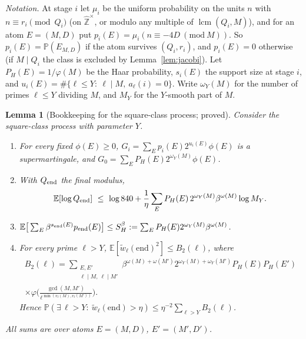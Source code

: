 \documentclass[11pt,reqno]{amsart}
\newtheorem{lemma}[theorem]{Lemma}
\theoremstyle{definition}
\newcommand{\lcm}{\operatorname{lcm}}
\newcommand{\E}{\mathbb E}
\newcommand{\PP}{\mathbb P}
\begin{document}
\emph{Notation.}  At stage $i$ let $\mu_i$ be the uniform probability on the
units $n$ with $n\equiv r_i\pmod{Q_i}$ (on $\hat{\mathbb Z}^\times$, or modulo
any multiple of $\lcm(Q_i,M)$), and for an atom $E=(M,D)$ put
$p_i(E)=\mu_i(n\equiv-4D\ (\mathrm{mod}\ M))$.  So $p_i(E)=\PP(E_{M,D})$ if the
atom survives $(Q_i,r_i)$, and $p_i(E)=0$ otherwise (if $M\mid Q_i$ the class
is excluded by Lemma~\ref{lem:jacobi}).  Let $P_H(E)=1/\varphi(M)$ be the Haar
probability, $s_i(E)$ the support size at stage $i$, and
$u_i(E)=\#\{\ell\le Y:\ \ell\mid M,\ a_\ell(i)=0\}$.  Write $\omega_Y(M)$ for the
number of primes $\ell\le Y$ dividing $M$, and $M_Y$ for the $Y$-smooth part of
$M$.

\begin{lemma}[Bookkeeping for the square-class process; proved]\label{lem:book}
Consider the square-class process with parameter $Y$.
\begin{enumerate}
\item[(a)] For every fixed $\phi(E)\ge0$, $G_i=\sum_Ep_i(E)2^{u_i(E)}\phi(E)$ is
a supermartingale, and $G_0=\sum_EP_H(E)2^{\omega_Y(M)}\phi(E)$.
\item[(b)] With $Q_{\rm end}$ the final modulus,
\[
 \E[\log Q_{\rm end}]\ \le\ \log840+\frac1\eta\sum_EP_H(E)\,2^{\omega_Y(M)}\beta^{\omega(M)}\log M_Y .
\]
\item[(c)] $\E\big[\sum_E\beta^{s_{\rm end}(E)}p_{\rm end}(E)\big]\le S_H^\beta:=\sum_EP_H(E)2^{\omega_Y(M)}\beta^{\omega(M)}$.
\item[(d)] For every prime $\ell>Y$, $\E[\tilde w_\ell(\mathrm{end})^2]\le B_2(\ell)$, where
\begin{multline*}
 B_2(\ell)=\sum_{\substack{E,E'\\ \ell\mid M,\ \ell\mid M'}}\beta^{\omega(M)+\omega(M')}2^{\omega_Y(M)+\omega_Y(M')}P_H(E)P_H(E')\\
 \times\varphi\Big(\frac{\gcd(M,M')}{\ell^{\min(v_\ell(M),v_\ell(M'))}}\Big).
\end{multline*}
Hence $\PP(\exists\,\ell>Y:\ \tilde w_\ell(\mathrm{end})>\eta)\le\eta^{-2}\sum_{\ell>Y}B_2(\ell)$.
\end{enumerate}
All sums are over atoms $E=(M,D)$, $E'=(M',D')$.
\end{lemma}
\end{document}
